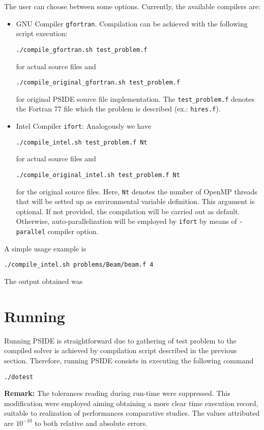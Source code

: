 \documentclass[a4paper,11pt]{article}
\theoremstyle{comm}
\begin{document}
The user can choose between some options. Currently, the available compilers are:
\begin{itemize}
\item GNU Compiler \texttt{gfortran}. Compilation can be achieved with the following script execution:

\begin{Verbatim}[frame=single]
./compile_gfortran.sh test_problem.f
\end{Verbatim}
for actual source files and
\begin{Verbatim}[frame=single]
./compile_original_gfortran.sh test_problem.f
\end{Verbatim}
for original PSIDE source file implementation. The \texttt{test\_problem.f} denotes the Fortran 77 file which the problem is described (ex.: \texttt{hires.f}).

\item Intel Compiler \texttt{ifort}: Analogously we have

\begin{Verbatim}[frame=single]
./compile_intel.sh test_problem.f Nt
\end{Verbatim}
for actual source files and
\begin{Verbatim}[frame=single]
./compile_original_intel.sh test_problem.f Nt
\end{Verbatim}
for the original source files. Here, \texttt{Nt} denotes the number of OpenMP threads that will be setted up as environmental variable definition. This argument is optional. If not provided, the compilation will be carried out as default. Otherwise, auto-parallelization will be employed by \texttt{ifort} by means of \texttt{-parallel} compiler option.

\end{itemize}

A simple usage example is
\begin{Verbatim}[frame=single]
./compile_intel.sh problems/Beam/beam.f 4
\end{Verbatim}

The output obtained was


\section{Running}

Running PSIDE is straightforward due to gathering of test problem to the compiled solver is achieved by compilation script described in the previous section. Therefore, running PSIDE consists in executing the following command
\begin{Verbatim}[frame=single]
./dotest
\end{Verbatim}

\textbf{Remark:} The tolerances reading during run-time were suppressed. This modification were employed aiming obtaining a more clear time execution record, suitable to realization of performances comparative studies. The values attributed are $10^{-10}$ to both relative and absolute errors.
\end{document}
